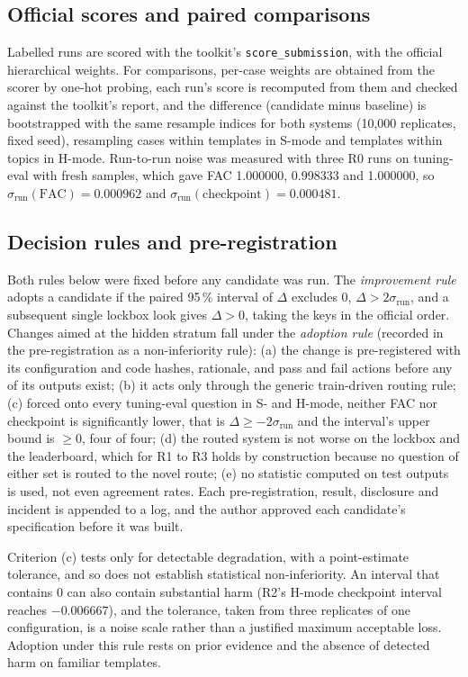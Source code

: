 \documentclass[conference]{IEEEtran}
\newcommand{\id}[1]{\texttt{#1}}
\begin{document}
\subsection{Official scores and paired comparisons}\label{sec:compare}
Labelled runs are scored with the toolkit's \id{score\_submission}, with the official hierarchical weights. For comparisons, per-case weights are obtained from the scorer by one-hot probing, each run's score is recomputed from them and checked against the toolkit's report, and the difference (candidate minus baseline) is bootstrapped with the same resample indices for both systems (10,000 replicates, fixed seed), resampling cases within templates in S-mode and templates within topics in H-mode. Run-to-run noise was measured with three R0 runs on tuning-eval with fresh samples, which gave FAC 1.000000, 0.998333 and 1.000000, so $\sigma_{\mathrm{run}}(\mathrm{FAC})=0.000962$ and $\sigma_{\mathrm{run}}(\mathrm{checkpoint})=0.000481$.

\subsection{Decision rules and pre-registration}\label{sec:rules}
Both rules below were fixed before any candidate was run. The \emph{improvement rule} adopts a candidate if the paired 95\,\% interval of $\Delta$ excludes 0, $\Delta>2\sigma_{\mathrm{run}}$, and a subsequent single lockbox look gives $\Delta>0$, taking the keys in the official order. Changes aimed at the hidden stratum fall under the \emph{adoption rule} (recorded in the pre-registration as a non-inferiority rule): (a) the change is pre-registered with its configuration and code hashes, rationale, and pass and fail actions before any of its outputs exist; (b) it acts only through the generic train-driven routing rule; (c) forced onto every tuning-eval question in S- and H-mode, neither FAC nor checkpoint is significantly lower, that is $\Delta\ge-2\sigma_{\mathrm{run}}$ and the interval's upper bound is $\ge0$, four of four; (d) the routed system is not worse on the lockbox and the leaderboard, which for R1 to R3 holds by construction because no question of either set is routed to the novel route; (e) no statistic computed on test outputs is used, not even agreement rates. Each pre-registration, result, disclosure and incident is appended to a log, and the author approved each candidate's specification before it was built.

Criterion (c) tests only for detectable degradation, with a point-estimate tolerance, and so does not establish statistical non-inferiority. An interval that contains 0 can also contain substantial harm (R2's H-mode checkpoint interval reaches $-0.006667$), and the tolerance, taken from three replicates of one configuration, is a noise scale rather than a justified maximum acceptable loss. Adoption under this rule rests on prior evidence and the absence of detected harm on familiar templates.
\end{document}
